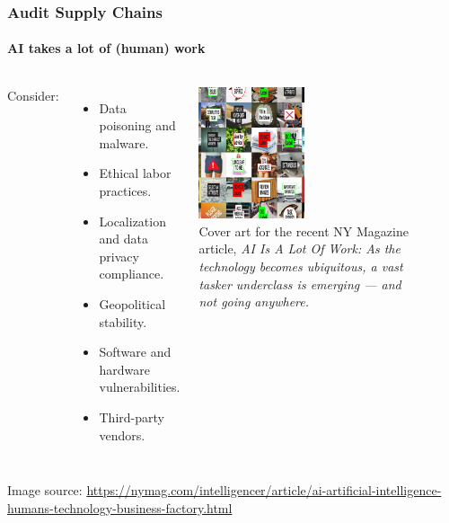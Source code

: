 \documentclass[11pt,
               aspectratio=169,
               hyperref={colorlinks}
               ]{beamer}
\begin{document}
		\begin{frame}
			
			\frametitle{Audit Supply Chains}
			\framesubtitle{AI takes a lot of (human) work}
			
			\begin{columns}
			
				Consider:
				\begin{itemize}
					\item Data poisoning and malware.
					\item Ethical labor practices.
					\item Localization and data privacy compliance. 
					\item Geopolitical stability. 
					\item Software and hardware vulnerabilities.
					\item Third-party vendors. 
				\end{itemize}
			
				\centering
				\includegraphics[height=110pt]{../img/Audit_SC.png}\\
		
				\scriptsize{\tiny{Cover art for the recent NY Magazine article, \textit{AI Is A Lot Of Work: As the technology becomes ubiquitous, a vast tasker underclass is emerging — and not going anywhere.}}}
				\par\noindent\rule{100pt}{0.4pt}\\
		
			\end{columns}
		
			\noindent\scriptsize{Image source: \url{https://nymag.com/intelligencer/article/ai-artificial-intelligence-humans-technology-business-factory.html}}
		
			
		\end{frame}
		
\end{document}
